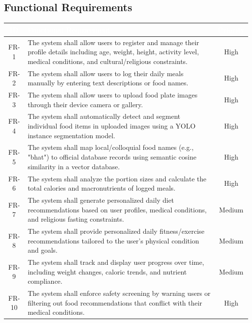 \documentclass[11pt,a4paper]{article}
\newcommand{\reqheader}[3]{%
  \rowcolor{srsnavy}
  \textcolor{white}{\textbf{#1}} &
  \textcolor{white}{\textbf{#2}} &
  \textcolor{white}{\textbf{#3}} \\ \hline}
\begin{document}
\subsection{Functional Requirements}
\renewcommand{\arraystretch}{1.35}
\begin{tabularx}{\textwidth}{|c|X|c|}
\hline
\reqheader{ID}{Functional Requirement}{Priority}
FR-1 & The system shall allow users to register and manage their profile details including age, weight, height, activity level, medical conditions, and cultural/religious constraints. & High \\ \hline
FR-2 & The system shall allow users to log their daily meals manually by entering text descriptions or food names. & High \\ \hline
FR-3 & The system shall allow users to upload food plate images through their device camera or gallery. & High \\ \hline
FR-4 & The system shall automatically detect and segment individual food items in uploaded images using a YOLO instance segmentation model. & High \\ \hline
FR-5 & The system shall map local/colloquial food names (e.g., "bhat") to official database records using semantic cosine similarity in a vector database. & High \\ \hline
FR-6 & The system shall analyze the portion sizes and calculate the total calories and macronutrients of logged meals. & High \\ \hline
FR-7 & The system shall generate personalized daily diet recommendations based on user profiles, medical conditions, and religious fasting constraints. & Medium \\ \hline
FR-8 & The system shall provide personalized daily fitness/exercise recommendations tailored to the user's physical condition and goals. & Medium \\ \hline
FR-9 & The system shall track and display user progress over time, including weight changes, caloric trends, and nutrient compliance. & Medium \\ \hline
FR-10 & The system shall enforce safety screening by warning users or filtering out food recommendations that conflict with their medical conditions. & High \\ \hline
\end{tabularx}
\end{document}
